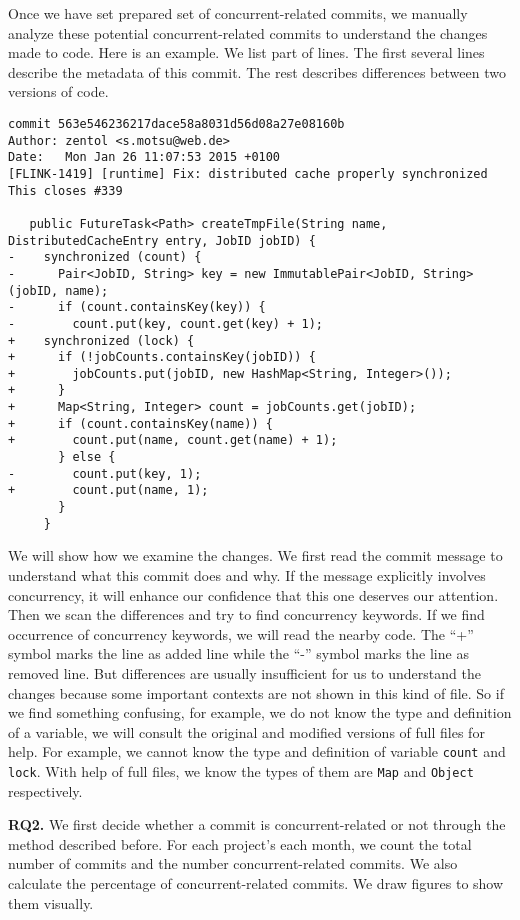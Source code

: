 Once we have set prepared set of concurrent-related commits, we manually analyze these potential concurrent-related commits to understand the changes made to code. Here is an example. We list part of lines. The first several lines describe the metadata of this commit. The rest describes differences between two versions of code.

\begin{lstlisting}
commit 563e546236217dace58a8031d56d08a27e08160b
Author: zentol <s.motsu@web.de>
Date:   Mon Jan 26 11:07:53 2015 +0100
[FLINK-1419] [runtime] Fix: distributed cache properly synchronized
This closes #339

   public FutureTask<Path> createTmpFile(String name, DistributedCacheEntry entry, JobID jobID) {
-    synchronized (count) {
-      Pair<JobID, String> key = new ImmutablePair<JobID, String>(jobID, name);
-      if (count.containsKey(key)) {
-        count.put(key, count.get(key) + 1);
+    synchronized (lock) {
+      if (!jobCounts.containsKey(jobID)) {
+        jobCounts.put(jobID, new HashMap<String, Integer>());
+      }
+      Map<String, Integer> count = jobCounts.get(jobID);
+      if (count.containsKey(name)) {
+        count.put(name, count.get(name) + 1);
       } else {
-        count.put(key, 1);
+        count.put(name, 1);
       }
     }
\end{lstlisting}

We will show how we examine the changes. We first read the commit message to understand what this commit does and why. If the message explicitly involves concurrency, it will enhance our confidence that this one deserves our attention. Then we scan the differences and try to find concurrency keywords. If we find occurrence of concurrency keywords, we will read the nearby code. The ``+'' symbol marks the line as added line while the ``-'' symbol marks the line as removed line. But differences are usually insufficient for us to understand the changes because some important contexts are not shown in this kind of file. So if we find something confusing, for example, we do not know the type and definition of a variable, we will consult the original and modified versions of full files for help. For example, we cannot know the type and definition of variable \texttt{count} and \texttt{lock}. With help of full files, we know the types of them are \texttt{Map} and \texttt{Object} respectively.

\textbf{RQ2.} We first decide whether a commit is concurrent-related or not through the method described before. For each project's each month, we count the total number of commits and the number concurrent-related commits. We also calculate the percentage of concurrent-related commits. We draw figures to show them visually.


